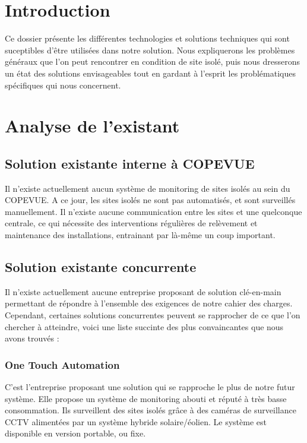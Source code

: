 \section{Introduction}


Ce dossier présente les différentes technologies et solutions techniques qui sont suceptibles d’être utilisées dans notre solution. Nous expliquerons les problèmes généraux que l’on peut rencontrer en condition de site isolé, puis nous dresserons un état des solutions envisageables tout en gardant à l'esprit les problématiques spécifiques qui nous concernent.

\section{Analyse de l'existant}

\subsection{Solution existante interne à COPEVUE}

Il n’existe actuellement aucun système de monitoring de sites isolés au sein du COPEVUE. A ce jour, les sites isolés ne sont pas automatisés, et sont surveillés manuellement. Il n’existe aucune communication entre les sites et une quelconque centrale, ce qui nécessite des interventions régulières de relèvement et maintenance des installations, entrainant par là-même un coup important.

\subsection{Solution existante concurrente}

Il n’existe actuellement aucune entreprise proposant de solution clé-en-main permettant de répondre à l'ensemble des exigences de notre cahier des charges. Cependant, certaines solutions concurrentes peuvent se rapprocher de ce que l'on chercher à atteindre, voici une liste succinte des plus convaincantes que nous avons trouvés :

\subsubsection{One Touch Automation}

C’est l’entreprise proposant une solution qui se rapproche le plus de notre futur système.
Elle propose un système de monitoring abouti et réputé à très basse consommation. Ils surveillent des sites isolés grâce à des caméras de surveillance CCTV alimentées par un système hybride solaire/éolien. Le système est disponible en version portable, ou fixe.

